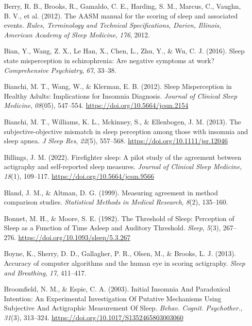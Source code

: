 \documentclass[
]{article}
\newlength{\cslhangindent}
\newenvironment{CSLReferences}[2] %
 {\begin{list}{}{%
  \setlength{\itemindent}{0pt}
  \setlength{\leftmargin}{0pt}
  \setlength{\parsep}{0pt}
  \ifodd #1
   \setlength{\leftmargin}{\cslhangindent}
   \setlength{\itemindent}{-1\cslhangindent}
  \fi
  \setlength{\itemsep}{#2\baselineskip}}}
 {\end{list}}
\begin{document}
\begin{CSLReferences}{1}{0}
Berry, R. B., Brooks, R., Gamaldo, C. E., Harding, S. M., Marcus, C., Vaughn, B. V., et al. (2012). The AASM manual for the scoring of sleep and associated events. \emph{Rules, Terminology and Technical Specifications, Darien, Illinois, American Academy of Sleep Medicine}, \emph{176}, 2012.

Bian, Y., Wang, Z. X., Le Han, X., Chen, L., Zhu, Y., \& Wu, C. J. (2016). Sleep state misperception in schizophrenia: Are negative symptoms at work? \emph{Comprehensive Psychiatry}, \emph{67}, 33--38.

Bianchi, M. T., Wang, W., \& Klerman, E. B. (2012). Sleep {Misperception} in {Healthy} {Adults}: {Implications} for {Insomnia} {Diagnosis}. \emph{Journal of Clinical Sleep Medicine}, \emph{08}(05), 547--554. \url{https://doi.org/10.5664/jcsm.2154}

Bianchi, M. T., Williams, K. L., Mckinney, S., \& Ellenbogen, J. M. (2013). The subjective-objective mismatch in sleep perception among those with insomnia and sleep apnea. \emph{J Sleep Res}, \emph{22}(5), 557--568. \url{https://doi.org/10.1111/jsr.12046}

Billings, J. M. (2022). Firefighter sleep: A pilot study of the agreement between actigraphy and self-reported sleep measures. \emph{Journal of Clinical Sleep Medicine}, \emph{18}(1), 109--117. \url{https://doi.org/10.5664/jcsm.9566}

Bland, J. M., \& Altman, D. G. (1999). Measuring agreement in method comparison studies. \emph{Statistical Methods in Medical Research}, \emph{8}(2), 135--160.

Bonnet, M. H., \& Moore, S. E. (1982). The {Threshold} of {Sleep}: {Perception} of {Sleep} as a {Function} of {Time} {Asleep} and {Auditory} {Threshold}. \emph{Sleep}, \emph{5}(3), 267--276. \url{https://doi.org/10.1093/sleep/5.3.267}

Boyne, K., Sherry, D. D., Gallagher, P. R., Olsen, M., \& Brooks, L. J. (2013). Accuracy of computer algorithms and the human eye in scoring actigraphy. \emph{Sleep and Breathing}, \emph{17}, 411--417.

Broomfield, N. M., \& Espie, C. A. (2003). Initial {Insomnia} {And} {Paradoxical} {Intention}: {An} {Experimental} {Investigation} {Of} {Putative} {Mechanisms} {Using} {Subjective} {And} {Actigraphic} {Measurement} {Of} {Sleep}. \emph{Behav. Cognit. Psychother.}, \emph{31}(3), 313--324. \url{https://doi.org/10.1017/S1352465803003060}


\end{CSLReferences}
\end{document}

